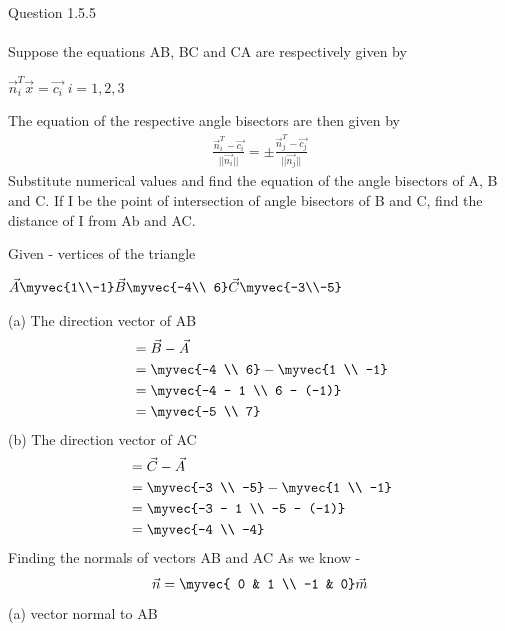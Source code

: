\documentclass[journal,12pt,twocolumn]{IEEEtran}
\theoremstyle{remark}
\begin{document}
Question 1.5.5 \\ \\Suppose the equations AB, BC and CA are respectively given by

$\vec{n}_{i}^{T}\vec{x} = \vec{c_{i}}  \,\,i=1 , 2 , 3$

The equation of the respective angle bisectors are then given by
\begin{align}
\frac{\vec{n}_{i}^{T} - \vec{c_{i}}}{||\vec{n_{i}}||} = \pm \frac{\vec{n}_{j}^{T} - \vec{c_{j}}}{||\vec{n_{j}}||}
\end{align}
Substitute numerical values and find the equation of the angle bisectors of A, B and C. If I be the point of intersection of angle bisectors of B and C, find the distance of I from Ab and AC.

\solution
Given - vertices of the triangle

$\vec{A} \myvec{1\\-1} \vec{B}\myvec{-4\\ 6} \vec{C}\myvec{-3\\-5}$

(a) The direction vector of AB
\begin{align}
&= \vec{B} - \vec{A} \\
&= \myvec{-4 \\ 6} - \myvec{1 \\ -1}\\
&= \myvec{-4 - 1 \\ 6 - (-1)} \\
&= \myvec{-5 \\ 7}
\end{align}
(b) The direction vector of AC
\begin{align}
&= \vec{C} - \vec{A} \\
&= \myvec{-3 \\ -5} - \myvec{1 \\ -1}\\
&= \myvec{-3 - 1 \\ -5 - (-1)} \\
&= \myvec{-4 \\ -4}
\end{align}
Finding the normals of vectors AB and AC
As we know -
\begin{align}
\vec{n}=\myvec{ 0 & 1 \\ -1 & 0} \vec{m}
\end{align}
(a) vector normal to AB
\end{document}
